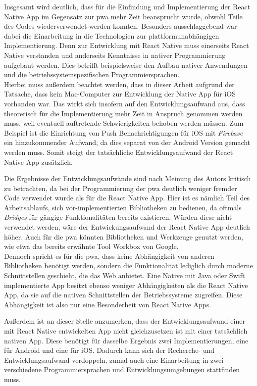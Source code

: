 Insgesamt wird deutlich, dass für die Einfindung und Implementierung der React Native App im Gegensatz zur \ac{pwa} mehr Zeit beansprucht wurde, obwohl Teile des Codes wiederverwendet werden konnten.
Besonders ausschlaggebend war dabei die Einarbeitung in die Technologien zur plattformunabhängigen Implementierung.
Denn zur Entwicklung mit React Native muss einerseits React Native verstanden und anderseits Kenntnisse in nativer Programmierung aufgebaut werden.
Dies betrifft beispielsweise den Aufbau nativer Anwendungen und die betriebssystemspezifischen Programmiersprachen.\\
Hierbei muss außerdem beachtet werden, dass in dieser Arbeit aufgrund der Tatsache, dass kein Mac-Computer zur Entwicklung der Native App für iOS vorhanden war.
Das wirkt sich insofern auf den Entwicklungsaufwand aus, dass theoretisch für die Implementierung mehr Zeit in Anspruch genommen werden muss, weil eventuell auftretende Schwierigkeiten behoben werden müssen.
Zum Beispiel ist die Einrichtung von Push Benachrichtigungen für iOS mit \textit{Firebase} ein hinzukommender Aufwand, da dies separat von der Android Version gemacht werden muss.
Somit steigt der tatsächliche Entwicklungsaufwand der React Native App zusätzlich.

Die Ergebnisse der Entwicklungsaufwände sind nach Meinung des Autors kritisch zu betrachten, da bei der Programmierung der \ac{pwa} deutlich weniger fremder Code verwendet wurde als für die React Native App.
Hier ist es nämlich Teil des Arbeitsablaufs, sich vor-implementierten Bibliotheken zu bedienen, da oftmals \textit{Bridges} für gängige Funktionalitäten bereits existieren.
Würden diese nicht verwendet werden, wäre der Entwickungsaufwand der React Native App deutlich höher.
Auch für die \ac{pwa} könnten Bibliotheken und Werkzeuge genutzt werden, wie etwa das bereits erwähnte Tool \glqq Workbox\grqq{} von Google.\\
Dennoch spricht es für die \ac{pwa}, dass keine Abhängigkeit von anderen Bibliotheken benötigt werden, sondern die Funktionalität lediglich durch moderne Schnittstellen geschieht, die das Web anbietet.
Eine Native mit Java oder Swift implementierte App besitzt ebenso weniger Abhängigkeiten als die React Native App, da sie auf die nativen Schnittstellen der Betriebssysteme zugreifen.
Diese Abhängigkeit ist also nur eine Besonderheit von React Native Apps.

Außerdem ist an dieser Stelle anzumerken, dass der Entwicklungsaufwand einer mit React Native entwickelten App nicht gleichzusetzen ist mit einer tatsächlich nativen App.
Diese benötigt für dasselbe Ergebnis zwei Implementierungen, eine für Android und eine für iOS.
Dadurch kann sich der Recherche- und Entwicklungsaufwand verdoppeln, zumal auch eine Einarbeitung in zwei verschiedene Programmiersprachen und Entwicklungsumgebungen stattfinden muss.

